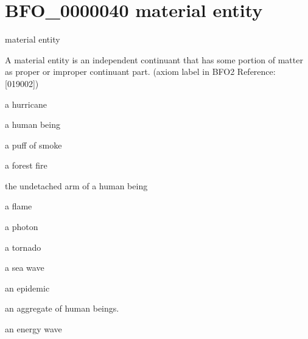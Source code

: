 \documentclass[letterpaper,10pt,english]{sphinxmanual}
\begin{document}
\section{BFO\_0000040 \sphinxhyphen{} material entity}
\label{\detokenize{doc-BFO_0000040:bfo-0000040-material-entity}}\label{\detokenize{doc-BFO_0000040:index-0}}\label{\detokenize{doc-BFO_0000040::doc}}
\begin{sphinxShadowBox}

\sphinxAtStartPar
material entity
\end{sphinxShadowBox}

\begin{sphinxShadowBox}

\sphinxAtStartPar
A material entity is an independent continuant that has some portion of matter as proper or improper continuant part. (axiom label in BFO2 Reference: {[}019\sphinxhyphen{}002{]})
\end{sphinxShadowBox}

\begin{sphinxShadowBox}

\sphinxAtStartPar
a hurricane

\sphinxAtStartPar
a human being

\sphinxAtStartPar
a puff of smoke

\sphinxAtStartPar
a forest fire

\sphinxAtStartPar
the undetached arm of a human being

\sphinxAtStartPar
a flame

\sphinxAtStartPar
a photon

\sphinxAtStartPar
a tornado

\sphinxAtStartPar
a sea wave

\sphinxAtStartPar
an epidemic

\sphinxAtStartPar
an aggregate of human beings.

\sphinxAtStartPar
an energy wave
\end{sphinxShadowBox}
\end{document}
